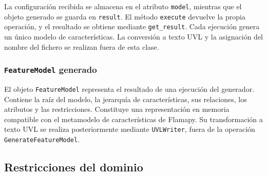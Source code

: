 La configuración recibida se almacena en el atributo \texttt{model},
mientras que el objeto generado se guarda en \texttt{result}. El método
\texttt{execute} devuelve la propia operación, y el resultado se obtiene
mediante \texttt{get\_result}. Cada ejecución genera un único modelo de
características. La conversión a texto UVL y la asignación del nombre
del fichero se realizan fuera de esta clase.

\subsubsection*{\texttt{FeatureModel} generado}

El objeto \texttt{FeatureModel} representa el resultado de una ejecución
del generador. Contiene la raíz del modelo, la jerarquía de
características, sus relaciones, los atributos y las restricciones.
Constituye una representación en memoria compatible con el metamodelo
de características de Flamapy. Su transformación a texto UVL se realiza
posteriormente mediante \texttt{UVLWriter}, fuera de la operación
\texttt{GenerateFeatureModel}.

\subsection{Restricciones del dominio}
\label{subsec:constraints_dominio}



